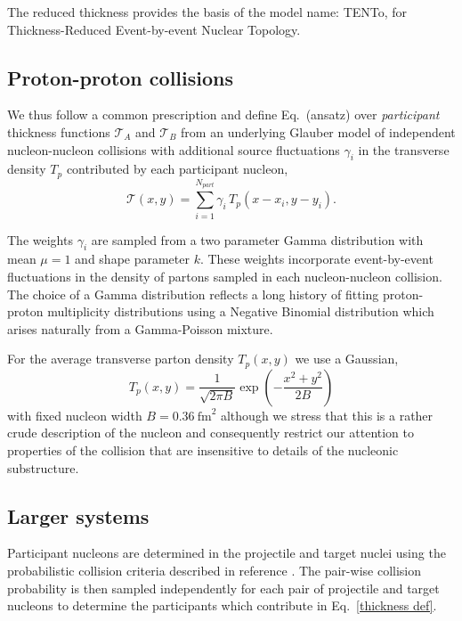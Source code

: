 \documentclass[aps,prl,reprint,amsmath,nofootinbib]{revtex4-1}
\begin{document}
The reduced thickness provides the basis of the model name:
T\raisebox{-.5ex}{R}ENTo, for Thickness-Reduced Event-by-event Nuclear Topology.

\subsection{Proton-proton collisions}

We thus follow a common prescription and define Eq.~(ansatz) over \emph{participant} thickness
functions $\mathcal{T}_A$ and $\mathcal{T}_B$ from an underlying Glauber model of independent nucleon-nucleon
collisions with additional source fluctuations $\gamma_i$ in the transverse density $T_p$ contributed by each
participant nucleon,
\begin{equation}
  \label{thickness def}
  \mathcal{T}(x,y) = \sum\limits_{i=1}^{N_{part}} \gamma_i\, T_p(x-x_i,y-y_i).
\end{equation}

The weights $\gamma_i$ are sampled from a two parameter Gamma distribution with mean $\mu=1$ and shape
parameter $k$. These weights incorporate event-by-event fluctuations in the density of partons sampled in each
nucleon-nucleon collision. The choice of a Gamma distribution reflects a long history of fitting proton-proton
multiplicity distributions using a Negative Binomial distribution which arises naturally from a Gamma-Poisson
mixture.

For the average transverse parton density $T_p(x,y)$ we use a Gaussian,
\begin{equation}
  T_p(x,y) = \frac{1}{\sqrt{2 \pi B}} \exp\left(-\frac{x^2+y^2}{2 B}\right)
\end{equation}
with fixed nucleon width $B=0.36 ~\mathrm{fm}^2$ although we stress that this is a rather crude description of
the nucleon and consequently restrict our attention to properties of the collision that are insensitive to
details of the nucleonic substructure.

\subsection{Larger systems}

Participant nucleons are determined in the projectile and target nuclei using the probabilistic collision
criteria described in reference \cite{proton-proton}.  The pair-wise collision probability is then sampled
independently for each pair of projectile and target nucleons to determine the participants which contribute
in Eq.~\eqref{thickness def}.
\end{document}

